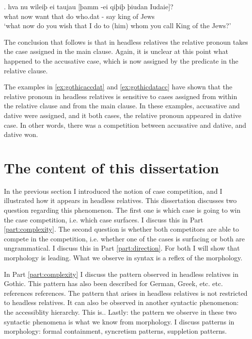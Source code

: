 \exg. hva nu wileiþ ei taujau [þamm -ei qiþiþ þiudan Iudaie]?\\
 what now want that do\scsub{[dat]} who.\ac{dat} - say\scsub{[acc]} king {of Jews}\\
 `what now do you wish that I do to (him) whom you call King of the Jews?' \label{ex:gothicdatacc}

The conclusion that follows is that in headless relatives the relative pronoun takes the case assigned in the main clause. Again, it is unclear at this point what happened to the accusative case, which is now assigned by the predicate in the relative clause.

The examples in \ref{ex:gothicaccdat} and \ref{ex:gothicdatacc} have shown that the relative pronoun in headless relatives is sensitive to cases assigned from within the relative clause and from the main clause. In these examples, accusative and dative were assigned, and it both cases, the relative pronoun appeared in dative case. In other words, there was a competition between accusative and dative, and dative won.



\section{The content of this dissertation}

In the previous section I introduced the notion of case competition, and I illustrated how it appears in headless relatives. This dissertation discusses two question regarding this phenomenon.
The first one is which case is going to win the case competition, i.e. which case surfaces. I discuss this in Part \ref{part:complexity}.
The second question is whether both competitors are able to compete in the competition, i.e. whether one of the cases is surfacing or both are ungrammatical. I discuss this in Part \ref{part:direction}.
For both I will show that morphology is leading. What we observe in syntax is a reflex of the morphology.

In Part \ref{part:complexity} I discuss the pattern observed in headless relatives in Gothic. This pattern has also been described for German, Greek, etc. etc. references references.
The pattern that arises in headless relatives is not restricted to headless relatives. It can also be observed in another syntactic phenomenon: the accessiblity hierarchy. This is..
Lastly: the pattern we observe in these two syntactic phenomena is what we know from morphology. I discuss patterns in morphology: formal containment, syncretism patterns, suppletion patterns.

